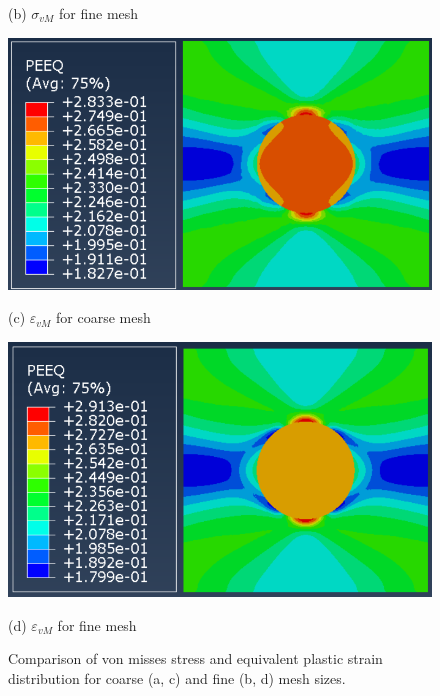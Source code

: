 \documentclass[12pt]{article}
\begin{document}
\begin{figure}[H]
\begin{minipage}{0.48\textwidth}
        \caption*{(b) $\sigma_{vM}$ for fine mesh}
    \end{minipage}
    \vspace{1em}
    \begin{minipage}{0.48\textwidth}
        \centering
        \includegraphics[width=\textwidth]{images/PEEQ_Coarse.png}
        \caption*{(c) $\varepsilon_{vM}$ for coarse mesh}
    \end{minipage}
    \hfill
    \begin{minipage}{0.48\textwidth}
        \centering
        \includegraphics[width=\textwidth]{images/PEEQ_Fine.png}
        \caption*{(d) $\varepsilon_{vM}$ for fine mesh}
    \end{minipage}
    \caption{Comparison of von misses stress and equivalent plastic strain distribution 
    for coarse (a, c) and fine (b, d) mesh 
    sizes.}
    \label{fig:stressFields}
\end{figure}
\end{document}
